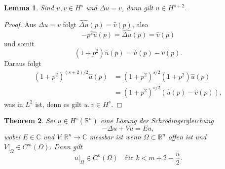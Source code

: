 \documentclass[
paper=a4,
bibtotocnumbered,
liststotocnumbered,
tablecaptionabove,
pointlessnumbers,
twoside,
openright,
10pt
]
{report}
\newtheorem{thm}{Theorem}[chapter]
\newtheorem{lem}[thm]{Lemma}
\theoremstyle{definition}
\numberwithin{equation}{chapter}
\begin{document}
\begin{lem}\label{thm6.8}
Sind $u,v\in H^s$ und $\Delta u=v$, dann gilt $u\in H^{s+2}$.
\end{lem}
\begin{proof}
Aus $\Delta u=v$ folgt $\widehat{\Delta u} (p) = \hat v(p)$, also
\begin{equation}
-p^2 \hat u(p) = \widehat{\Delta u} (p) = \hat v(p)
\end{equation}
und somit
\begin{equation}
(1+p^2) \hat u(p) = \hat u(p) - \hat v(p).
\end{equation}
Daraus folgt
\begin{align}
(1+p^2)^{(s+2)/2} \hat u(p) &= (1+p^2)^{s/2} (1+p^2) \hat u(p) \\
&= (1+p^2)^{s/2} (\hat u(p) -  \hat v(p)),
\end{align}
was in $L^2$ ist, denn es gilt $u,v\in H^s$.
\end{proof}
\begin{thm}\label{4.9}
Sei $u\in H^s(\mathbb R^n)$ eine Lösung der Schrödingergleichung
\begin{equation}
-\Delta u + Vu = Eu,
\end{equation}
wobei $E\in \mathbb C$ und $V: \mathbb R^n\to \mathbb C$ messbar ist wenn $\Omega \subset \mathbb R^n$ offen ist und $V\big|_\Omega \in C^m(\Omega)$. Dann gilt
\begin{equation}
u\big|_\Omega \in C^k(\Omega) \quad \text{für } k<m+2-\frac{n}{2}.
\end{equation}
\end{thm}
\end{document}
